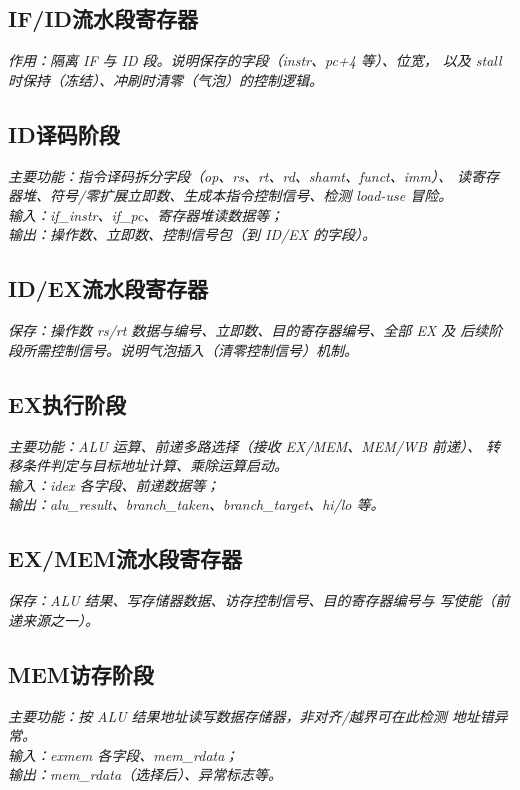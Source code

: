 \documentclass[UTF8,a4paper,12pt,fontset=none]{ctexart}
\numberwithin{figure}{section}
\numberwithin{table}{section}
\newcommand{\placeholder}[1]{\textcolor{black!55}{\emph{#1}}}
\begin{document}
\subsection{IF/ID流水段寄存器}
\placeholder{作用：隔离 IF 与 ID 段。说明保存的字段（instr、pc+4 等）、位宽，
以及 stall 时保持（冻结）、冲刷时清零（气泡）的控制逻辑。}

\subsection{ID译码阶段}
\placeholder{主要功能：指令译码拆分字段（op、rs、rt、rd、shamt、funct、imm）、
读寄存器堆、符号/零扩展立即数、生成本指令控制信号、检测 load-use 冒险。\\
输入：if\_instr、if\_pc、寄存器堆读数据等；\\
输出：操作数、立即数、控制信号包（到 ID/EX 的字段）。}

\subsection{ID/EX流水段寄存器}
\placeholder{保存：操作数 rs/rt 数据与编号、立即数、目的寄存器编号、全部 EX 及
后续阶段所需控制信号。说明气泡插入（清零控制信号）机制。}

\subsection{EX执行阶段}
\placeholder{主要功能：ALU 运算、前递多路选择（接收 EX/MEM、MEM/WB 前递）、
转移条件判定与目标地址计算、乘除运算启动。\\
输入：idex 各字段、前递数据等；\\
输出：alu\_result、branch\_taken、branch\_target、hi/lo 等。}

\subsection{EX/MEM流水段寄存器}
\placeholder{保存：ALU 结果、写存储器数据、访存控制信号、目的寄存器编号与
写使能（前递来源之一）。}

\subsection{MEM访存阶段}
\placeholder{主要功能：按 ALU 结果地址读写数据存储器，非对齐/越界可在此检测
地址错异常。\\
输入：exmem 各字段、mem\_rdata；\\
输出：mem\_rdata（选择后）、异常标志等。}
\end{document}

